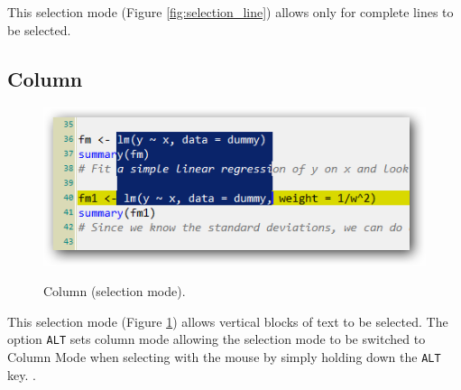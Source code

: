 This selection mode
(Figure \ref{fig:selection_line})
allows only for complete lines to be selected.

\hypertarget{working_selectionmode_column}{}
\subsection{Column}

\begin{figure}[h!]
  \includegraphics[scale=0.35]{./res/selection_column.png}\\
  \caption{Column (selection mode).}
  \label{fig:selection_column}
\end{figure}

This selection mode
(Figure \ref{fig:selection_column})
allows vertical blocks of text to be selected.
The option \texttt{ALT} sets column mode allowing the selection
mode to be switched to Column Mode when selecting with the mouse
by simply holding down the \texttt{ALT} key.
.
